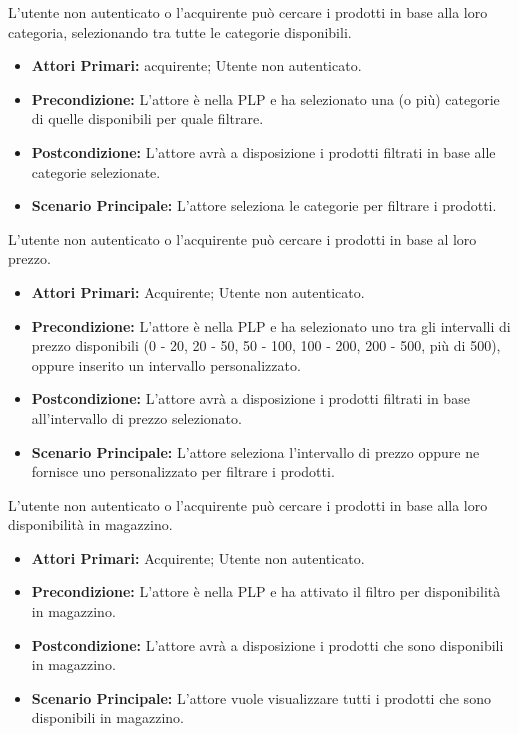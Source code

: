 \resetSubUC

L'utente non autenticato o l'acquirente può cercare i prodotti in base alla loro categoria, selezionando tra tutte le categorie disponibili.
\begin{itemize}
    \item \textbf{Attori Primari:} acquirente; Utente non autenticato.
    \item \textbf{Precondizione:} L'attore è nella PLP e ha selezionato una (o più) categorie di quelle disponibili per quale filtrare.
    \item \textbf{Postcondizione:} L'attore avrà a disposizione i prodotti filtrati in base alle categorie selezionate.
    \item \textbf{Scenario Principale:} L'attore seleziona le categorie per filtrare i prodotti.
\end{itemize}

L'utente non autenticato o l'acquirente può cercare i prodotti in base al loro prezzo.
\begin{itemize}
    \item \textbf{Attori Primari:} Acquirente; Utente non autenticato.
    \item \textbf{Precondizione:} L'attore è nella PLP e ha selezionato uno tra gli intervalli di prezzo disponibili (0 - 20, 20 - 50, 50 - 100, 100 - 200, 200 - 500, più di 500), oppure inserito un intervallo personalizzato.
    \item \textbf{Postcondizione:} L'attore avrà a disposizione i prodotti filtrati in base all'intervallo di prezzo selezionato.
    \item \textbf{Scenario Principale:} L'attore seleziona l'intervallo di prezzo oppure ne fornisce uno personalizzato per filtrare i prodotti.
\end{itemize}

L'utente non autenticato o l'acquirente può cercare i prodotti in base alla loro disponibilità in magazzino.
\begin{itemize}
    \item \textbf{Attori Primari:} Acquirente; Utente non autenticato.
    \item \textbf{Precondizione:} L'attore è nella PLP e ha attivato il filtro per disponibilità in magazzino.
    \item \textbf{Postcondizione:} L'attore avrà a disposizione i prodotti che sono disponibili in magazzino.
    \item \textbf{Scenario Principale:} L'attore vuole visualizzare tutti i prodotti che sono disponibili in magazzino.
\end{itemize}

